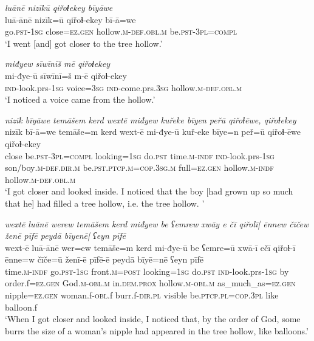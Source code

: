 \ea \label{ZQ.36}
\textit{luānē nizīkū qiřoɫekey bīyāwe} \\ 
\gll luā-ānē nizīk=ū qiřoɫ-ekey bī-ā=we \\ 
 go\textsc{.pst}\textsc{-\textsc{1sg}} close=\textsc{ez.gen} hollow\textsc{.m}\textsc{-def}\textsc{.obl}\textsc{.m} be\textsc{.pst}\textsc{-3pl}\textsc{=compl} \\ 
\glt `I went [and] got closer to the tree hollow.'
\z 
 
\ea \label{ZQ.37}
\textit{miđyew sīwīnīš mē qiřoɫekey} \\ 
\gll mi-đye-ū sīwīnī=š m-ē qiřoɫ-ekey \\ 
 \textsc{ind-}look.prs\textsc{-\textsc{1sg}} voice\textsc{=3sg} \textsc{ind-}come.prs\textsc{.3sg} hollow\textsc{.m}\textsc{-def}\textsc{.obl}\textsc{.m} \\ 
\glt `I noticed a voice came from the hollow.'
\z 
 
\ea \label{ZQ.38}
\textit{nizīk bīyāwe temāšem kerd wextē miđyew kuřeke bīyen peřū qiřoɫēwe, qiřoɫekey} \\ 
\gll nizīk bī-ā=we temāše=m kerd wext-ē mi-đye-ū kuř-eke bīye=n peř=ū qiřoɫ-ēwe qiřoɫ-ekey \\ 
 close be\textsc{.pst}\textsc{-3pl}\textsc{=compl} looking\textsc{=\textsc{1sg}} do\textsc{.pst} time\textsc{.m}\textsc{-indf} \textsc{ind-}look.prs\textsc{-\textsc{1sg}} son/boy\textsc{.m}\textsc{-def}\textsc{.dir}\textsc{.m} be\textsc{.pst}\textsc{.ptcp}\textsc{.m}\textsc{=cop}\textsc{.3sg}\textsc{.m} full\textsc{=ez.gen} hollow\textsc{.m}\textsc{-indf} hollow\textsc{.m}\textsc{-def}\textsc{.obl}\textsc{.m} \\ 
\glt `I got closer and looked inside. I noticed that the boy [had grown up so much that he] had filled a tree hollow, i.e. the tree hollow. '
\z 
 
\ea \label{ZQ.39}
\textit{wextē luānē werew temāšem kerd miđyew be ʕemrew xwāy e čī qiřolī| ēnnew čīčew ženē pīfē peydā bīyenē| ʕeyn pīfē} \\ 
\gll wext-ē luā-ānē wer=ew temāše=m kerd mi-đye-ū be ʕemre=ū xwā-ī ečī qiřoɫ-ī ēnne=w čīče=ū ženī-ē pīfē-ē peydā bīyē=nē ʕeyn pīfē \\ 
 time\textsc{.m}\textsc{-indf} go\textsc{.pst}\textsc{-\textsc{1sg}} front\textsc{.m}\textsc{=\textsc{post}} looking\textsc{=\textsc{1sg}} do\textsc{.pst} \textsc{ind-}look.prs\textsc{-\textsc{1sg}} by order.f\textsc{=ez.gen} God\textsc{.m}\textsc{-obl}\textsc{.m} in.\textsc{dem.prox} hollow\textsc{.m}\textsc{-obl}\textsc{.m} as\_much\_as\textsc{=ez.gen} nipple\textsc{=ez.gen} woman.f\textsc{-obl}.f burr.f\textsc{-dir}\textsc{.pl} visible be\textsc{.ptcp}\textsc{.pl}\textsc{=cop}\textsc{.3pl} like balloon.f \\ 
\glt `When I got closer and looked inside, I noticed that, by the order of God, some burrs the size of a woman's nipple had appeared in the tree hollow, like balloons.'
\z 
 

